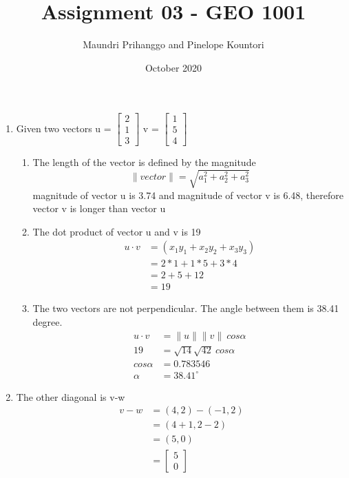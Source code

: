 \documentclass{article}
\title{Assignment 03 - GEO 1001}
\author{Maundri Prihanggo and Pinelope Kountori }
\date{October 2020}
\begin{document}
\maketitle


\begin{enumerate}
  \item Given two vectors u =  $  \begin{bmatrix}    2\\    1\\    3  \end{bmatrix}  $ v =     $  \begin{bmatrix}    1\\    5\\    4  \end{bmatrix}  $
  \begin{enumerate}
      \item The length of the vector is defined by the magnitude \[ \|vector\| = \sqrt{a_{1}^2 + a_{2}^2 + a_{3}^2} \] magnitude of vector u is 3.74 and magnitude of vector v is 6.48, therefore vector v is longer than vector u
      \item The dot product of vector u and v is 19 \begin{align*} u \cdot v &= (x_{1}y_{1} + x_{2}y_{2} + x_{3}y_{3}) \\  &= 2*1 + 1*5 + 3*4 \\ &= 2+5+12 \\ &= 19 \end{align*} 
      \item The two vectors are not perpendicular. The angle between them is 38.41 degree. \begin{align*} u \cdot v &= \|u\| \|v\| \: cos \alpha \\ 19 &= \sqrt{14} \sqrt{42} \: cos \alpha \\ cos \alpha &= 0.783546 \\ \alpha &= 38.41^{\circ} \end{align*} 
  \end{enumerate}
  \item The other diagonal is v-w \begin{align*}
      v-w &= (4,2) - (-1,2) \\ &= (4+1, 2-2) \\ &= (5,0) \\ &= \begin{bmatrix} 5 \\ 0 \end{bmatrix}

\end{align*}
\end{enumerate}
\end{document}
